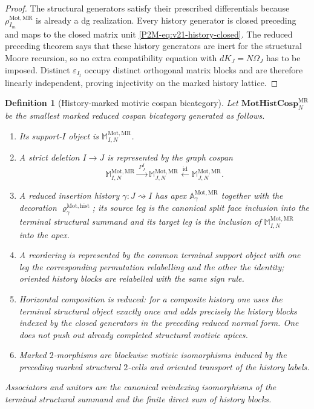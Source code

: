 \documentclass[11pt]{article}
\newtheorem{definition}[theorem]{Definition}
\theoremstyle{remark}
\newcommand{\Mot}{\mathrm{Mot}}
\newcommand{\MR}{\mathrm{MR}}
\begin{document}
\begin{proof}
The structural generators satisfy their prescribed differentials because
$\rho_{I_m}^{\Mot,\MR}$ is already a dg realization.  Every history generator
is closed preceding and maps to the closed matrix unit
\eqref{P2M-eq:v21-history-closed}.  The reduced preceding theorem says that these
history generators are inert for the structural Moore recursion, so no extra
compatibility equation with $dK_J=N\Omega_J$ has to be imposed.  Distinct
$\varepsilon_{I_t}$ occupy distinct orthogonal matrix blocks and are therefore
linearly independent, proving injectivity on the marked history lattice.
\end{proof}


\begin{definition}[History-marked motivic cospan bicategory]
\label{P2M-def:v21-motivic-history-bicategory}
Let $\mathbf{MotHistCosp}_{N}^{\MR}$ be the smallest marked reduced cospan bicategory generated as
follows.
\begin{enumerate}[label=\textup{(\roman*)}]
\item Its support-$I$ object is $\mathbb M_{I,N}^{\Mot,\MR}$.
\item A strict deletion $I\to J$ is represented by the graph cospan
      \[
       \mathbb M_{I,N}^{\Mot,\MR}
       \xrightarrow{\ P_J^I\ }
       \mathbb M_{J,N}^{\Mot,\MR}
       \xleftarrow{\mathrm{id}}
       \mathbb M_{J,N}^{\Mot,\MR}.
      \]
\item A reduced insertion history $\gamma:J\rightsquigarrow I$ has apex
      $\mathbb A_\gamma^{\Mot,\MR}$ together with the decoration
      $\varrho_\gamma^{\Mot,\mathrm{hist}}$; its source leg is the canonical
      split face inclusion into the terminal structural summand and its target
      leg is the inclusion of $\mathbb M_{I,N}^{\Mot,\MR}$ into the apex.
\item A reordering is represented by the common terminal support object with
      one leg the corresponding permutation relabelling and the other the
      identity; oriented history blocks are relabelled with the same sign rule.
\item Horizontal composition is \emph{reduced}: for a composite history one
      uses the terminal structural object exactly once and adds precisely the
      history blocks indexed by the closed generators in the preceding reduced
      normal form.  One does not push out already completed structural motivic
      apices.
\item Marked $2$-morphisms are blockwise motivic isomorphisms induced by the
      preceding marked structural $2$-cells and oriented transport of the
      history labels.
\end{enumerate}
Associators and unitors are the canonical reindexing isomorphisms of the
terminal structural summand and the finite direct sum of history blocks.
\end{definition}
\end{document}
